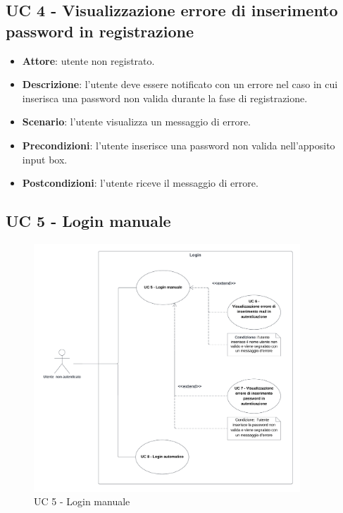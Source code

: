 \subsection{UC 4 - Visualizzazione errore di inserimento password in registrazione}
\begin{itemize}
    \item \textbf{Attore}: utente non registrato.
    \item \textbf{Descrizione}: l'utente deve essere notificato con un errore nel caso in cui inserisca una password non valida durante la fase di registrazione.
    \item \textbf{Scenario}: l'utente visualizza un messaggio di errore.
    \item \textbf{Precondizioni}: l'utente inserisce una password non valida nell'apposito input box.
    \item \textbf{Postcondizioni}: l'utente riceve il messaggio di errore.
\end{itemize}

\subsection{UC 5 - Login manuale}

\begin{figure}[!h]
    \includegraphics[width=10cm]{sezioni/Images/UC5.png}
    \centering
    \caption{UC 5 - Login manuale}
\end{figure}

